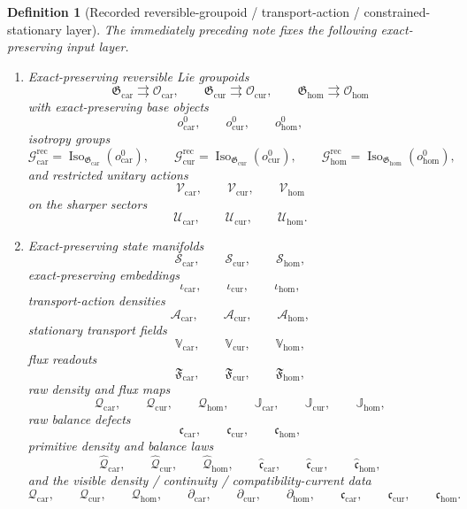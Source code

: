 \documentclass[11pt]{article}
\newcommand{\RootTensorClass}{\mathscr U_{\mathrm{car}}}
\newcommand{\RootRelabelClass}{\mathscr U_{\mathrm{cur}}}
\newcommand{\RootFreeClass}{\mathscr U_{\mathrm{hom}}}
\newcommand{\TensorDensity}{\mathcal Q_{\mathrm{car}}}
\newcommand{\CurDensity}{\mathcal Q_{\mathrm{cur}}}
\newcommand{\HomDensity}{\mathcal Q_{\mathrm{hom}}}
\newcommand{\TensorCont}{\partial_{\mathrm{car}}}
\newcommand{\CurCont}{\partial_{\mathrm{cur}}}
\newcommand{\HomCont}{\partial_{\mathrm{hom}}}
\newcommand{\TensorCurrent}{\mathfrak c_{\mathrm{car}}}
\newcommand{\CurCurrent}{\mathfrak c_{\mathrm{cur}}}
\newcommand{\HomCurrent}{\mathfrak c_{\mathrm{hom}}}
\newcommand{\TensorReconGroup}{\mathcal G_{\mathrm{car}}^{\mathrm{rec}}}
\newcommand{\CurReconGroup}{\mathcal G_{\mathrm{cur}}^{\mathrm{rec}}}
\newcommand{\HomReconGroup}{\mathcal G_{\mathrm{hom}}^{\mathrm{rec}}}
\newcommand{\TensorReconAct}{\mathscr V_{\mathrm{car}}}
\newcommand{\CurReconAct}{\mathscr V_{\mathrm{cur}}}
\newcommand{\HomReconAct}{\mathscr V_{\mathrm{hom}}}
\newcommand{\TensorStateManifold}{\mathcal S_{\mathrm{car}}}
\newcommand{\CurStateManifold}{\mathcal S_{\mathrm{cur}}}
\newcommand{\HomStateManifold}{\mathcal S_{\mathrm{hom}}}
\newcommand{\TensorStateEmbed}{\iota_{\mathrm{car}}}
\newcommand{\CurStateEmbed}{\iota_{\mathrm{cur}}}
\newcommand{\HomStateEmbed}{\iota_{\mathrm{hom}}}
\newcommand{\TensorRawDensity}{\boldsymbol{\mathcal Q}_{\mathrm{car}}}
\newcommand{\CurRawDensity}{\boldsymbol{\mathcal Q}_{\mathrm{cur}}}
\newcommand{\HomRawDensity}{\boldsymbol{\mathcal Q}_{\mathrm{hom}}}
\newcommand{\TensorTransport}{\mathbb V_{\mathrm{car}}}
\newcommand{\CurTransport}{\mathbb V_{\mathrm{cur}}}
\newcommand{\HomTransport}{\mathbb V_{\mathrm{hom}}}
\newcommand{\TensorFlux}{\mathbb J_{\mathrm{car}}}
\newcommand{\CurFlux}{\mathbb J_{\mathrm{cur}}}
\newcommand{\HomFlux}{\mathbb J_{\mathrm{hom}}}
\newcommand{\TensorRawBalance}{\boldsymbol{\mathfrak c}_{\mathrm{car}}}
\newcommand{\CurRawBalance}{\boldsymbol{\mathfrak c}_{\mathrm{cur}}}
\newcommand{\HomRawBalance}{\boldsymbol{\mathfrak c}_{\mathrm{hom}}}
\newcommand{\TensorPrimitiveDensity}{\widehat{\mathcal Q}_{\mathrm{car}}}
\newcommand{\CurPrimitiveDensity}{\widehat{\mathcal Q}_{\mathrm{cur}}}
\newcommand{\HomPrimitiveDensity}{\widehat{\mathcal Q}_{\mathrm{hom}}}
\newcommand{\TensorBalance}{\widehat{\mathfrak c}_{\mathrm{car}}}
\newcommand{\CurBalance}{\widehat{\mathfrak c}_{\mathrm{cur}}}
\newcommand{\HomBalance}{\widehat{\mathfrak c}_{\mathrm{hom}}}
\newcommand{\TensorGroupoid}{\mathfrak G_{\mathrm{car}}}
\newcommand{\CurGroupoid}{\mathfrak G_{\mathrm{cur}}}
\newcommand{\HomGroupoid}{\mathfrak G_{\mathrm{hom}}}
\newcommand{\TensorObjClass}{\mathcal O_{\mathrm{car}}}
\newcommand{\CurObjClass}{\mathcal O_{\mathrm{cur}}}
\newcommand{\HomObjClass}{\mathcal O_{\mathrm{hom}}}
\newcommand{\TensorObjBase}{o_{\mathrm{car}}^0}
\newcommand{\CurObjBase}{o_{\mathrm{cur}}^0}
\newcommand{\HomObjBase}{o_{\mathrm{hom}}^0}
\newcommand{\TensorActionDensity}{\mathscr A_{\mathrm{car}}}
\newcommand{\CurActionDensity}{\mathscr A_{\mathrm{cur}}}
\newcommand{\HomActionDensity}{\mathscr A_{\mathrm{hom}}}
\newcommand{\TensorFluxRead}{\mathfrak F_{\mathrm{car}}}
\newcommand{\CurFluxRead}{\mathfrak F_{\mathrm{cur}}}
\newcommand{\HomFluxRead}{\mathfrak F_{\mathrm{hom}}}
\newcommand{\Iso}{\operatorname{Iso}}
\newtheorem{definition}{Definition}
\begin{document}
\begin{definition}[Recorded reversible-groupoid / transport-action / constrained-stationary layer]
\label{def:recorded_layer}
The immediately preceding note fixes the following exact-preserving input layer.
\begin{enumerate}
    \item Exact-preserving reversible Lie groupoids
    \[
    \TensorGroupoid\rightrightarrows\TensorObjClass,\qquad
    \CurGroupoid\rightrightarrows\CurObjClass,\qquad
    \HomGroupoid\rightrightarrows\HomObjClass
    \]
    with exact-preserving base objects
    \[
    \TensorObjBase,\qquad
    \CurObjBase,\qquad
    \HomObjBase,
    \]
    isotropy groups
    \[
    \TensorReconGroup=\Iso_{\TensorGroupoid}(\TensorObjBase),\qquad
    \CurReconGroup=\Iso_{\CurGroupoid}(\CurObjBase),\qquad
    \HomReconGroup=\Iso_{\HomGroupoid}(\HomObjBase),
    \]
    and restricted unitary actions
    \[
    \TensorReconAct,\qquad
    \CurReconAct,\qquad
    \HomReconAct
    \]
    on the sharper sectors
    \[
    \RootTensorClass,\qquad
    \RootRelabelClass,\qquad
    \RootFreeClass.
    \]
    \item Exact-preserving state manifolds
    \[
    \TensorStateManifold,\qquad
    \CurStateManifold,\qquad
    \HomStateManifold,
    \]
    exact-preserving embeddings
    \[
    \TensorStateEmbed,\qquad
    \CurStateEmbed,\qquad
    \HomStateEmbed,
    \]
    transport-action densities
    \[
    \TensorActionDensity,\qquad
    \CurActionDensity,\qquad
    \HomActionDensity,
    \]
    stationary transport fields
    \[
    \TensorTransport,\qquad
    \CurTransport,\qquad
    \HomTransport,
    \]
    flux readouts
    \[
    \TensorFluxRead,\qquad
    \CurFluxRead,\qquad
    \HomFluxRead,
    \]
    raw density and flux maps
    \[
    \TensorRawDensity,\qquad
    \CurRawDensity,\qquad
    \HomRawDensity,
    \qquad
    \TensorFlux,\qquad
    \CurFlux,\qquad
    \HomFlux,
    \]
    raw balance defects
    \[
    \TensorRawBalance,\qquad
    \CurRawBalance,\qquad
    \HomRawBalance,
    \]
    primitive density and balance laws
    \[
    \TensorPrimitiveDensity,\qquad
    \CurPrimitiveDensity,\qquad
    \HomPrimitiveDensity,
    \qquad
    \TensorBalance,\qquad
    \CurBalance,\qquad
    \HomBalance,
    \]
    and the visible density / continuity / compatibility-current data
    \[
    \TensorDensity,\qquad
    \CurDensity,\qquad
    \HomDensity,
    \qquad
    \TensorCont,\qquad
    \CurCont,\qquad
    \HomCont,
    \qquad
    \TensorCurrent,\qquad
    \CurCurrent,\qquad
    \HomCurrent.
    \]

\end{enumerate}
\end{definition}
\end{document}
